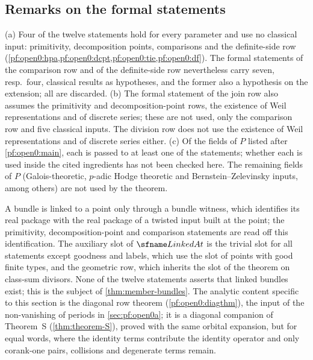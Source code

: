 \subsection{Remarks on the formal statements}\label{sec:pf:open0:remarks}

\begin{remark}\label{pf:open0:rem:unused}
(a) Four of the twelve statements hold for every parameter and use no classical input: primitivity, decomposition
points, comparisons and the definite-side row (\cref{pf:open0:hpa,pf:open0:dcpt,pf:open0:tie,pf:open0:df}). The formal statements
of the comparison row and of the definite-side row nevertheless carry seven, resp.\ four, classical results as hypotheses,
and the former also a hypothesis on the extension; all are discarded.
(b) The formal statement of the join row also assumes the primitivity and decomposition-point rows, the existence of
Weil representations and of discrete series; these are not used, only the comparison row and five classical inputs. The
division row does not use the existence of Weil representations and of discrete series either.
(c) Of the fields of $P$ listed after \cref{pf:open0:main}, each is passed to at least one of the statements; whether each is
used inside the cited ingredients has not been checked here. The remaining fields of $P$ (Galois-theoretic, $p$-adic Hodge
theoretic and Bernstein--Zelevinsky inputs, among others) are not used by the theorem.
\end{remark}

\begin{remark}\label{pf:open0:rem:content}
A bundle is linked to a point only through a bundle witness, which identifies its real package with the real package of a
twisted input built at the point; the primitivity, decomposition-point and comparison statements are read off this
identification. The auxiliary slot of $\openzeroLinked$ is the trivial slot for all statements except goodness and labels,
which use the slot of points with good finite types, and the geometric row, which inherits the slot of the theorem on
class-sum divisors.
None of the twelve statements asserts that linked bundles exist; this is the subject of \cref{thm:member-bundles}. The analytic
content specific to this section is the diagonal row theorem (\cref{pf:open0:diagthm}), the input of the non-vanishing of periods
in \cref{sec:pf:open0a}; it is a diagonal companion of Theorem~S (\cref{thm:theorem-S}), proved with the same orbital expansion,
but for equal words, where the identity terms contribute the identity operator and only corank-one pairs, collisions and
degenerate terms remain.
\end{remark}

